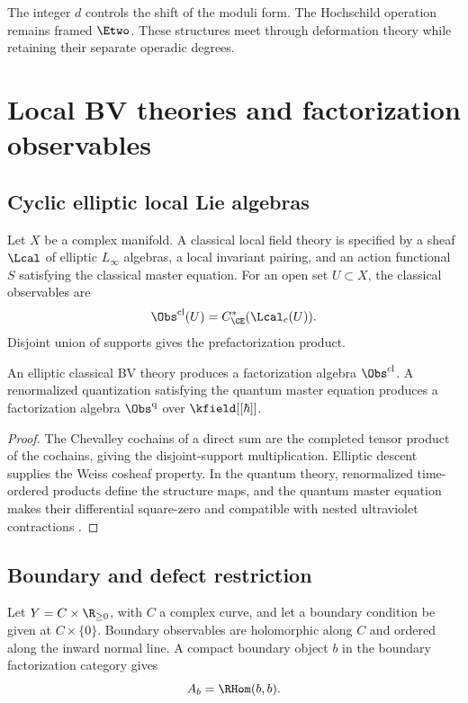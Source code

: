 The integer $d$ controls the shift of the moduli form. The Hochschild operation remains framed $\Etwo$. These structures meet through deformation theory while retaining their separate operadic degrees.

\chapter{Local BV theories and factorization observables}
\section{Cyclic elliptic local Lie algebras}
Let $X$ be a complex manifold. A classical local field theory is specified by a sheaf $\Lcal$ of elliptic $L_\infty$ algebras, a local invariant pairing, and an action functional $S$ satisfying the classical master equation. For an open set $U\subset X$, the classical observables are
\[
 \Obs^{\mathrm{cl}}(U)=C^*_{\CE}(\Lcal_c(U)).
\]
Disjoint union of supports gives the prefactorization product.

\begin{theorem}
An elliptic classical BV theory produces a factorization algebra $\Obs^{\mathrm{cl}}$. A renormalized quantization satisfying the quantum master equation produces a factorization algebra $\Obs^{\mathrm{q}}$ over $\kfield[[\hbar]]$.
\end{theorem}
\begin{proof}
The Chevalley cochains of a direct sum are the completed tensor product of the cochains, giving the disjoint-support multiplication. Elliptic descent supplies the Weiss cosheaf property. In the quantum theory, renormalized time-ordered products define the structure maps, and the quantum master equation makes their differential square-zero and compatible with nested ultraviolet contractions \cite{CG1,CG2}.
\end{proof}

\section{Boundary and defect restriction}
Let $Y=C\times\R_{\ge0}$, with $C$ a complex curve, and let a boundary condition be given at $C\times\{0\}$. Boundary observables are holomorphic along $C$ and ordered along the inward normal line. A compact boundary object $b$ in the boundary factorization category gives
\[
 A_b=\RHom(b,b).
\]

